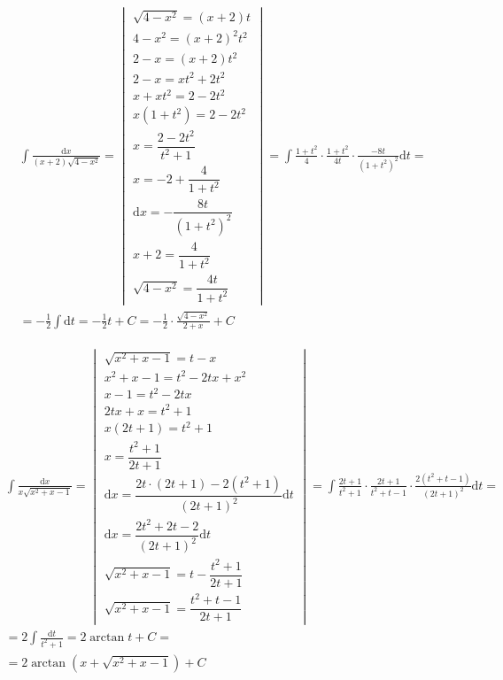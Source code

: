 \begin{gather*}
\int{\frac{\mbox{d}x}{(x+2)\sqrt{4-x^2}}} =
\begin{vmatrix}
  \sqrt{4-x^2}=(x+2)t\\
  4-x^2=(x+2)^2t^2\\
  2-x=(x+2)t^2\\
  2-x=xt^2+2t^2\\
  x+xt^2=2-2t^2\\
  x(1+t^2)=2-2t^2\\
  x=\dfrac{2-2t^2}{t^2+1}\\
  x=-2+\dfrac{4}{1+t^2}\\
  \mbox{d}x=-\dfrac{8t}{(1+t^2)^2}\\
  x+2=\dfrac{4}{1+t^2}\\
  \sqrt{4-x^2}=\dfrac{4t}{1+t^2}
\end{vmatrix}
= \int{\frac{1+t^2}{4}\cdot\frac{1+t^2}{4t}\cdot \frac{-8t}{(1+t^2)^2}\mbox{d}t} = \\
= -\frac{1}{2}\int{\mbox{d}t}
= -\frac{1}{2}t + C
= -\frac{1}{2}\cdot\frac{\sqrt{4-x^2}}{2+x}+C
\end{gather*}


\begin{gather*}
\int{\frac{\mbox{d}x}{x\sqrt{x^2+x-1}}} =
\begin{vmatrix}
  \sqrt{x^2+x-1}=t-x\\
  x^2+x-1=t^2-2tx+x^2\\
  x-1=t^2-2tx\\
  2tx+x=t^2+1\\
  x(2t+1)=t^2+1\\
  x=\dfrac{t^2+1}{2t+1}\\
  \mbox{d}x=\dfrac{2t\cdot(2t+1)-2(t^2+1)}{(2t+1)^2}\mbox{d}t\\
  \mbox{d}x=\dfrac{2t^2+2t-2}{(2t+1)^2}\mbox{d}t\\
  \sqrt{x^2+x-1} = t-\dfrac{t^2+1}{2t+1} \\
  \sqrt{x^2+x-1}=\dfrac{t^2+t-1}{2t+1}
\end{vmatrix}
= \int{\frac{2t+1}{t^2+1}\cdot\frac{2t+1}{t^2+t-1}\cdot\frac{2(t^2+t-1)}{(2t+1)^2}\mbox{d}t} = \\
= 2\int{\frac{\mbox{d}t}{t^2+1}}
= 2\arctan{t}+C = \\
= 2\arctan{(x+\sqrt{x^2+x-1})}+C
\end{gather*}



